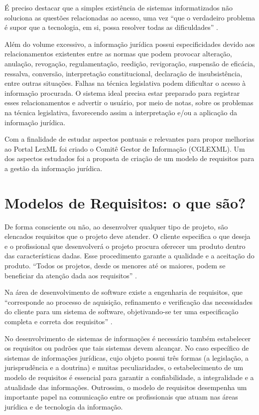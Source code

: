 \documentclass[a4paper,11pt,openright,twoside,english,brazil]{abntex2}
\begin{document}
É preciso destacar que a simples existência de sistemas informatizados não
soluciona as questões relacionadas ao acesso, uma vez ``que o verdadeiro problema
é supor que a tecnologia, em si, possa resolver todas as dificuldades''
\cite{davenport2001}.

Além do volume excessivo, a informação jurídica possui especificidades devido
aos relacionamentos existentes entre as normas que podem provocar alteração,
anulação, revogação, regulamentação, reedição, revigoração, suspensão de
eficácia, ressalva, conversão, interpretação constitucional, declaração de
insubsistência, entre outras situações. Falhas na técnica legislativa podem
dificultar o acesso à informação procurada. O sistema ideal precisa estar
preparado para registrar esses relacionamentos e advertir o usuário, por meio de
notas, sobre os problemas na técnica legislativa, favorecendo assim a
interpretação e/ou a aplicação da informação jurídica.

Com a finalidade de estudar aspectos pontuais e relevantes para propor melhorias
ao Portal LexML foi criado o Comitê Gestor de Informação (CGLEXML). Um dos
aspectos estudados foi a proposta de criação de um modelo de requisitos para a
gestão da informação jurídica.


\chapter{Modelos de Requisitos: o que são?}

De forma consciente ou não, ao desenvolver qualquer tipo de projeto, são
elencados requisitos que o projeto deve atender. O cliente especifica o que
deseja e o profissional que desenvolverá o projeto procura oferecer um produto
dentro das características dadas. Esse procedimento garante a qualidade e a
aceitação do produto. ``Todos os projetos, desde os menores até os maiores,
podem se beneficiar da atenção dada aos requisitos'' \cite{carvalho2002}.

Na área de desenvolvimento de software existe a engenharia de requisitos, que
``corresponde ao processo de aquisição, refinamento e verificação das
necessidades do cliente para um sistema de software, objetivando-se ter uma
especificação completa e correta dos requisitos'' \cite{carvalho2002}.

No desenvolvimento de sistemas de informações é necessário também estabelecer os
requisitos ou padrões que tais sistemas devem alcançar. No caso específico de
sistemas de informações jurídicas, cujo objeto possui três formas (a legislação,
a jurisprudência e a doutrina) e muitas peculiaridades, o estabelecimento de um
modelo de requisitos é essencial para garantir a confiabilidade, a integralidade
e a atualidade das informações. Outrossim, o modelo de requisitos desempenha um
importante papel na comunicação entre os profissionais que atuam nas áreas
jurídica e de tecnologia da informação.
\end{document}
